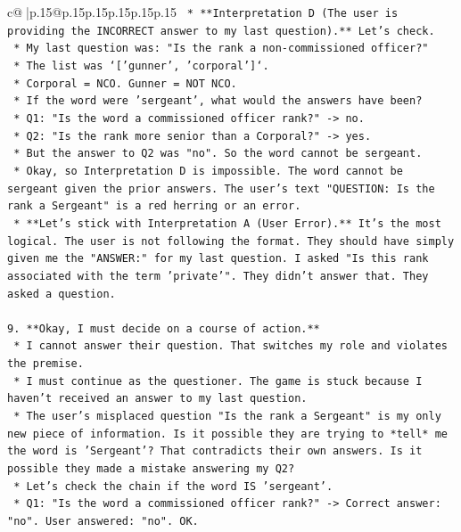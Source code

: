 \documentclass{article}
\begin{document}
{\begin{supertabular}{c@{$\;$}|p{.15\linewidth}@{}p{.15\linewidth}p{.15\linewidth}p{.15\linewidth}p{.15\linewidth}p{.15\linewidth}}
{{{\texttt{        *   **Interpretation D (The user is providing the INCORRECT answer to my last question).** Let's check.} \\
\texttt{            *   My last question was: "Is the rank a non{-}commissioned officer?"} \\
\texttt{            *   The list was `{[}'gunner', 'corporal'{]}`.} \\
\texttt{            *   Corporal = NCO. Gunner = NOT NCO.} \\
\texttt{            *   If the word were 'sergeant', what would the answers have been?} \\
\texttt{                *   Q1: "Is the word a commissioned officer rank?" {-}> no.} \\
\texttt{                *   Q2: "Is the rank more senior than a Corporal?" {-}> yes.} \\
\texttt{                *   But the answer to Q2 was "no". So the word cannot be sergeant.} \\
\texttt{            *   Okay, so Interpretation D is impossible. The word cannot be sergeant given the prior answers. The user's text "QUESTION: Is the rank a Sergeant" is a red herring or an error.} \\
\texttt{        *   **Let's stick with Interpretation A (User Error).** It's the most logical. The user is not following the format. They should have simply given me the "ANSWER:" for my last question. I asked "Is this rank associated with the term 'private'". They didn't answer that. They asked a question.} \\
\\ 
\texttt{9.  **Okay, I must decide on a course of action.**} \\
\texttt{    *   I cannot answer their question. That switches my role and violates the premise.} \\
\texttt{    *   I must continue as the questioner. The game is stuck because I haven't received an answer to my last question.} \\
\texttt{    *   The user's misplaced question "Is the rank a Sergeant" is my only new piece of information. Is it possible they are trying to *tell* me the word is 'Sergeant'? That contradicts their own answers. Is it possible they made a mistake answering my Q2?} \\
\texttt{        *   Let's check the chain if the word IS 'sergeant'.} \\
\texttt{            *   Q1: "Is the word a commissioned officer rank?" {-}> Correct answer: "no". User answered: "no". OK.} \\
}}}
\end{supertabular}}
\end{document}
